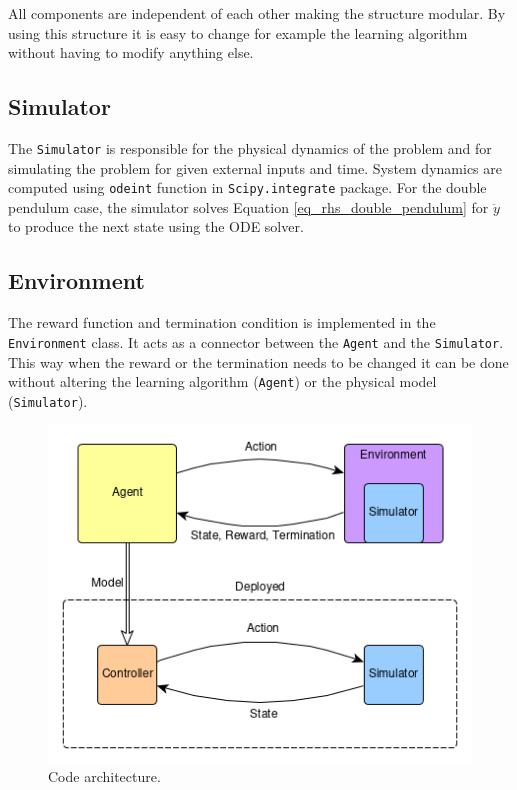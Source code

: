\documentclass[final]{LTHtwocol} %
\begin{document}
All components are independent of each other making the structure modular.
By using this structure it is easy to change for example the learning algorithm without having to modify anything else.

\subsection{Simulator}
The \texttt{Simulator} is responsible for the physical dynamics of the problem and for simulating the problem for given external inputs and time.
System dynamics are computed using \texttt{odeint} function in \texttt{Scipy.integrate} package.
For the double pendulum case, the simulator solves Equation \eqref{eq_rhs_double_pendulum} for $\ddot{y}$ to produce the next state using the ODE solver.


\subsection{Environment}
The reward function and termination condition is implemented in the \texttt{Environment} class.
It acts as a connector between the \texttt{Agent} and the \texttt{Simulator}.
This way when the reward or the termination needs to be changed it can be done without altering the learning algorithm (\texttt{Agent}) or the physical model (\texttt{Simulator}).



\begin{figure}[htp]
	\centering
	\includegraphics[width=0.9\columnwidth]{figures/CodeStructure.png}
	\caption{Code architecture.}
	\label{fig:code_architecture}
\end{figure}
\end{document}

